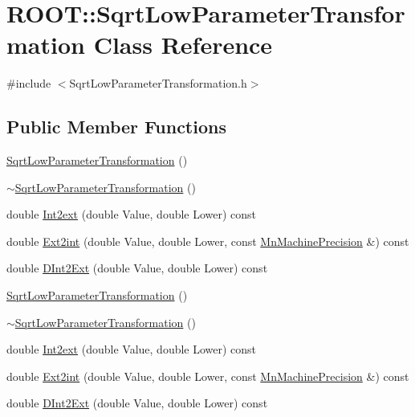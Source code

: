 \hypertarget{classROOT_1_1Minuit2_1_1SqrtLowParameterTransformation}{}\section{R\+O\+OT\+:\+:Sqrt\+Low\+Parameter\+Transformation Class Reference}
\label{classROOT_1_1Minuit2_1_1SqrtLowParameterTransformation}


{\ttfamily \#include $<$Sqrt\+Low\+Parameter\+Transformation.\+h$>$}

\subsection*{Public Member Functions}
\begin{DoxyCompactItemize}
\item 
\mbox{\hyperlink{classROOT_1_1Minuit2_1_1SqrtLowParameterTransformation_a2ed65b844471f395ab4528823afe39b6}{Sqrt\+Low\+Parameter\+Transformation}} ()
\item 
\mbox{\hyperlink{classROOT_1_1Minuit2_1_1SqrtLowParameterTransformation_acb1b80dd60331a48c2352696ff96784f}{$\sim$\+Sqrt\+Low\+Parameter\+Transformation}} ()
\item 
double \mbox{\hyperlink{classROOT_1_1Minuit2_1_1SqrtLowParameterTransformation_aaa3325280a05beb0e3f07b542d0aa7d8}{Int2ext}} (double Value, double Lower) const
\item 
double \mbox{\hyperlink{classROOT_1_1Minuit2_1_1SqrtLowParameterTransformation_a2035002e75f51cafc5e5d8afc05913e6}{Ext2int}} (double Value, double Lower, const \mbox{\hyperlink{classROOT_1_1Minuit2_1_1MnMachinePrecision}{Mn\+Machine\+Precision}} \&) const
\item 
double \mbox{\hyperlink{classROOT_1_1Minuit2_1_1SqrtLowParameterTransformation_ade7d793a9299b15dc6e218a11efdb15e}{D\+Int2\+Ext}} (double Value, double Lower) const
\item 
\mbox{\hyperlink{classROOT_1_1Minuit2_1_1SqrtLowParameterTransformation_a2ed65b844471f395ab4528823afe39b6}{Sqrt\+Low\+Parameter\+Transformation}} ()
\item 
\mbox{\hyperlink{classROOT_1_1Minuit2_1_1SqrtLowParameterTransformation_acb1b80dd60331a48c2352696ff96784f}{$\sim$\+Sqrt\+Low\+Parameter\+Transformation}} ()
\item 
double \mbox{\hyperlink{classROOT_1_1Minuit2_1_1SqrtLowParameterTransformation_aaa3325280a05beb0e3f07b542d0aa7d8}{Int2ext}} (double Value, double Lower) const
\item 
double \mbox{\hyperlink{classROOT_1_1Minuit2_1_1SqrtLowParameterTransformation_a2035002e75f51cafc5e5d8afc05913e6}{Ext2int}} (double Value, double Lower, const \mbox{\hyperlink{classROOT_1_1Minuit2_1_1MnMachinePrecision}{Mn\+Machine\+Precision}} \&) const
\item 
double \mbox{\hyperlink{classROOT_1_1Minuit2_1_1SqrtLowParameterTransformation_ade7d793a9299b15dc6e218a11efdb15e}{D\+Int2\+Ext}} (double Value, double Lower) const
\end{DoxyCompactItemize}


